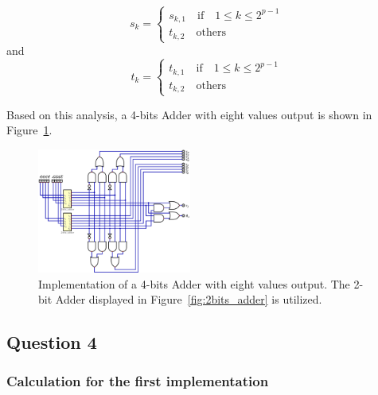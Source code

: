 \documentclass[conference]{IEEEtran}
\begin{document}
\begin{itemize}
    \begin{equation}
        s_k = \begin{cases}
            s_{k,1} \quad \text{if} \quad 1 \leq k \leq 2^{p-1} \\
            t_{k,2} \quad \text{others}
        \end{cases}
    \end{equation}
    and
    \begin{equation}
        t_k = \begin{cases}
            t_{k,1} \quad \text{if} \quad 1 \leq k \leq 2^{p-1} \\
            t_{k,2} \quad \text{others}
        \end{cases}
    \end{equation} 
\end{itemize}

Based on this analysis, a 4-bits Adder with eight values output is shown in Figure~\ref{fig:4bits_adder}.


\begin{figure}[h!]
\centering
\includegraphics[width=0.45\textwidth]{assets/4bits_adder.png}
\caption{Implementation of a 4-bits Adder with eight values output. The 2-bit Adder displayed in Figure~\ref{fig:2bits_adder} is utilized.}
\label{fig:4bits_adder}
\end{figure}





    
\subsection{Question 4}

\subsubsection{Calculation for the first implementation}\label{sec:q4}
\end{document}
